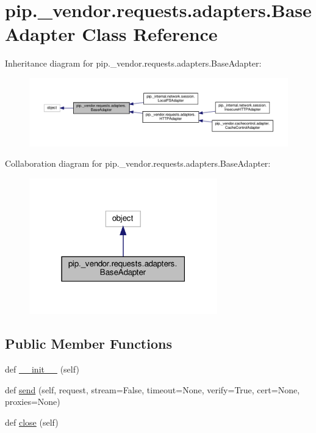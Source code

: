 \hypertarget{classpip_1_1__vendor_1_1requests_1_1adapters_1_1BaseAdapter}{}\section{pip.\+\_\+vendor.\+requests.\+adapters.\+Base\+Adapter Class Reference}
\label{classpip_1_1__vendor_1_1requests_1_1adapters_1_1BaseAdapter}


Inheritance diagram for pip.\+\_\+vendor.\+requests.\+adapters.\+Base\+Adapter\+:
\nopagebreak
\begin{figure}[H]
\begin{center}
\leavevmode
\includegraphics[width=350pt]{classpip_1_1__vendor_1_1requests_1_1adapters_1_1BaseAdapter__inherit__graph}
\end{center}
\end{figure}


Collaboration diagram for pip.\+\_\+vendor.\+requests.\+adapters.\+Base\+Adapter\+:
\nopagebreak
\begin{figure}[H]
\begin{center}
\leavevmode
\includegraphics[width=231pt]{classpip_1_1__vendor_1_1requests_1_1adapters_1_1BaseAdapter__coll__graph}
\end{center}
\end{figure}
\subsection*{Public Member Functions}
\begin{DoxyCompactItemize}
\item 
def \hyperlink{classpip_1_1__vendor_1_1requests_1_1adapters_1_1BaseAdapter_a6e2f3aee13fc76e5735ba9ee85525c46}{\+\_\+\+\_\+init\+\_\+\+\_\+} (self)
\item 
def \hyperlink{classpip_1_1__vendor_1_1requests_1_1adapters_1_1BaseAdapter_a837d77918210137cc87558a6e24621c7}{send} (self, request, stream=False, timeout=None, verify=True, cert=None, proxies=None)
\item 
def \hyperlink{classpip_1_1__vendor_1_1requests_1_1adapters_1_1BaseAdapter_a61a126812ffe92cd19f2156bc10f3707}{close} (self)
\end{DoxyCompactItemize}


